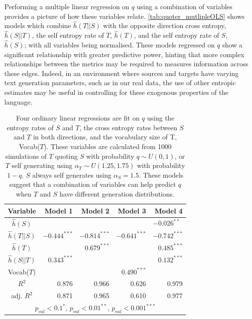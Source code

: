 Performing a multiple linear regression on $q$ using a combination of variables provides a picture of how these variables relate. \autoref{tab:quoter_mutlipleOLS} shows models which combine $\hat{h}(T||S)$ with the opposite direction cross entropy, $\hat{h}(S||T)$, the self entropy rate of $T$, $\hat{h}(T)$, and the self entropy rate of $S$, $\hat{h}(S)$; with all variables being normalised. These models regressed on $q$ show a significant relationship with greater predictive power, hinting that more complex relationships between the metrics may be required to measures information across these edges. Indeed, in an environment where sources and targets have varying text generation parameters, such as in our real data, the use of other entropic estimates may be useful in controlling for these exogenous properties of the language. 

\begin{table}[!htbp]
\centering 
\begin{tabular}{c|rrrr}
Variable& Model 1& Model 2& Model 3& Model 4\\ \hline
$\hat{h}(S)$& & & & $-0.026^{**}\,\,$\\
$\hat{h}(T||S)$& $-0.444^{***}$& $-0.814^{***}$& $-0.641^{***}$& $-0.742^{***}$\\
$\hat{h}(T)$& & $0.679^{***}$& & $0.485^{***}$\\
$\hat{h}(S||T)$& $0.343^{***}$& & & $0.132^{***}$\\
Vocab($T$)& & & $0.490^{***}$& \\\hline
\rule{0pt}{3ex}$R^2$& 0.876\;\;\;\;& 0.966\;\;\;\;& 0.626\;\;\;\;& 0.979\;\;\;\;\\ \hline
\rule{0pt}{3ex}adj. $R^2$& 0.871\;\;\;\;& 0.965\;\;\;\;& 0.610\;\;\;\;& 0.977\;\;\;\;\\ \hline
\multicolumn{5}{c}{$p_{val}<0.1^*$, $p_{val}<0.01^{**}$, $p_{val}<0.001^{***}$} \\ \hline\end{tabular}
\caption{Four ordinary linear regressions are fit on $q$ using the entropy rates of $S$ and $T$, the cross entropy rates between $S$ and $T$ in both directions, and the vocabulary size of T, Vocab($T$). These variables are calculated from 1000 simulations of $T$ quoting $S$ with probability $q\sim U(0,1)$, or $T$ self generating using $\alpha_T\sim U(1.25, 1.75)$ with probability $1-q$. $S$ always self generates using $\alpha_S = 1.5$. These models suggest that a combination of variables can help predict $q$ when $T$ and $S$ have different generation distributions.} \label{tab:quoter_mutlipleOLS}
\end{table}


